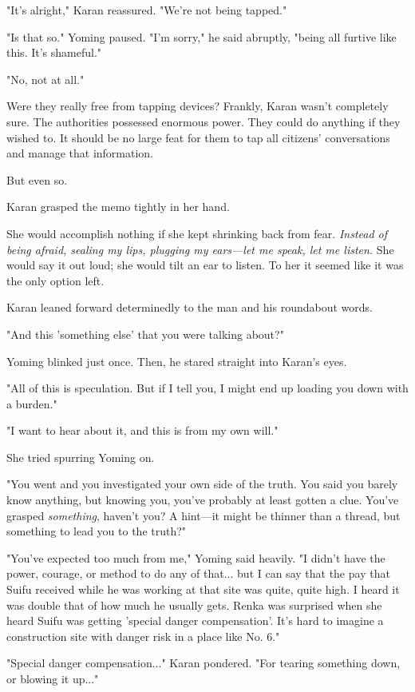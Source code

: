 "It's alright," Karan reassured. "We're not being tapped."

"Is that so." Yoming paused. "I'm sorry," he said abruptly, "being all
furtive like this. It's shameful."

"No, not at all."

Were they really free from tapping devices? Frankly, Karan wasn't
completely sure. The authorities possessed enormous power. They could do
anything if they wished to. It should be no large feat for them to tap
all citizens' conversations and manage that information.

But even so.

Karan grasped the memo tightly in her hand.

She would accomplish nothing if she kept shrinking back from fear.
\emph{Instead of being afraid, sealing my lips, plugging my ears---let me speak,
let me listen.} She would say it out loud; she would tilt an ear to
listen. To her it seemed like it was the only option left.

Karan leaned forward determinedly to the man and his roundabout words.

"And this 'something else' that you were talking about?"

Yoming blinked just once. Then, he stared straight into Karan's eyes.

"All of this is speculation. But if I tell you, I might end up loading
you down with a burden."

"I want to hear about it, and this is from my own will."

She tried spurring Yoming on.

"You went and you investigated your own side of the truth. You said you
barely know anything, but knowing you, you've probably at least gotten a
clue. You've grasped \emph{something}, haven't you? A hint---it might be thinner
than a thread, but something to lead you to the truth?"

"You've expected too much from me," Yoming said heavily. "I didn't have
the power, courage, or method to do any of that... but I can say that
the pay that Suifu received while he was working at that site was quite,
quite high. I heard it was double that of how much he usually gets.
Renka was surprised when she heard Suifu was getting 'special danger
compensation'. It's hard to imagine a construction site with danger risk
in a place like No. 6."

"Special danger compensation..." Karan pondered. "For tearing something
down, or blowing it up..."

